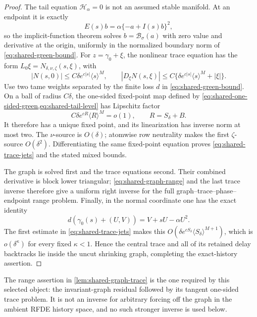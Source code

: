 \begin{proof}
The tail equation \(\mathscr H_\alpha=0\) is not an assumed stable
manifold.  At an endpoint it is exactly
\begin{equation}
 E(s)b=\alpha\{-a+I(s)b\}^2,                           \label{eq:shared-tail-level}
\end{equation}
so the implicit-function theorem solves \(b=\mathcal B_\sigma(a)\) with
zero value and derivative at the origin, uniformly in the normalized
boundary norm of \cref{eq:shared-green-bound}.  For
\(z=\gamma_0+\xi\), the nonlinear trace equation has the form
\(L_0\xi=N_{\delta,\nu,\zeta}(s,\xi)\), with
\[
 |N(s,0)|\le C\delta e^{c|s|}\langle s\rangle^M,
 \qquad
 |D_\xi N(s,\xi)|\le
 C\{\delta e^{c|s|}\langle s\rangle^M+|\xi|\}.
\]
Use two tame weights separated by the finite loss \(d\) in
\cref{eq:shared-green-bound}.  On a ball of radius \(C\delta\), the
one-sided fixed-point map defined by
\cref{eq:shared-one-sided-green,eq:shared-tail-level} has Lipschitz factor
\begin{equation}
 C\delta e^{cR}\langle R\rangle^M=o(1),
 \qquad R=S_\delta+B.                                 \label{eq:shared-trace-contraction}
\end{equation}
It therefore has a unique fixed point, and its linearization has inverse
norm at most two.  The \(\nu\)-source is \(O(\delta)\); atomwise row
neutrality makes the first \(\zeta\)-source \(O(\delta^2)\).
Differentiating the same fixed-point equation proves
\cref{eq:shared-trace-jets} and the stated mixed bounds.

The graph is solved first and the trace equations second.  Their combined
derivative is block lower triangular; \cref{eq:shared-graph-range} and the
last trace inverse therefore give a uniform right inverse for the full
graph--trace--phase--endpoint range problem.  Finally, in the normal
coordinate one has the exact identity
\[
 d(\gamma_0(s)+(U,V))=V+sU-\alpha U^2.
\]
The first estimate in \cref{eq:shared-trace-jets} makes this
\(O(\delta e^{cS_\delta}\langle S_\delta\rangle^{M+1})\), which is
\(o(\delta^\kappa)\) for every fixed \(\kappa<1\).  Hence the central trace
and all of its retained delay backtracks lie inside the uncut shrinking
graph, completing the exact-history assertion.
\end{proof}

The range assertion in \cref{lem:shared-graph-trace} is the one required by
this selected object: the invariant-graph residual followed by its tangent
one-sided trace problem.  It is not an inverse for arbitrary forcing off the
graph in the ambient RFDE history space, and no such stronger inverse is
used below.

